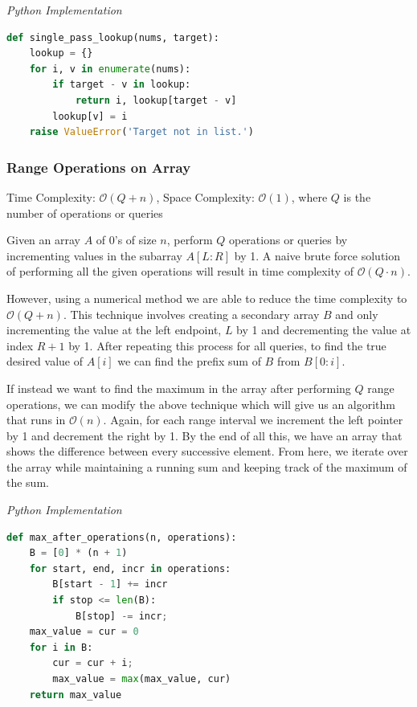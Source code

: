 \documentclass{article}
\newcommand{\bigO}{\mathcal{O}}
\begin{document}
\vspace{8pt} \emph{Python Implementation}
\begin{lstlisting}[language=Python]
def single_pass_lookup(nums, target):
    lookup = {}
    for i, v in enumerate(nums):
        if target - v in lookup:
            return i, lookup[target - v]
        lookup[v] = i
    raise ValueError('Target not in list.')
\end{lstlisting}
    
    \subsubsection{Range Operations on Array}
    Time Complexity: $\bigO(Q + n)$, Space Complexity: $\bigO(1)$, where $Q$ is the number of operations or queries
    
    Given an array $A$ of 0's of size $n$, perform $Q$ operations or queries by incrementing values in the subarray $A[L: R]$ by 1. A naive brute force solution of performing all the given operations will result in time complexity of $\bigO(Q\cdot n)$. 
    
    However, using a numerical method we are able to reduce the time complexity to $\bigO(Q + n)$. This technique involves creating a secondary array $B$ and only incrementing the value at the left endpoint, $L$ by 1 and decrementing the value at index $R + 1$ by 1. After repeating this process for all queries, to find the true desired value of $A[i]$ we can find the prefix sum of $B$ from $B[0:i]$.
    
    If instead we want to find the maximum in the array after performing $Q$ range operations, we can modify the above technique which will give us an algorithm that runs in $\bigO(n)$. Again, for each range interval we increment the left pointer by 1 and decrement the right by 1. By the end of all this, we have an array that shows the difference between every successive element. From here, we iterate over the array while maintaining a running sum and keeping track of the maximum of the sum.
    
\vspace{8pt} \emph{Python Implementation}
\begin{lstlisting}[language=Python]
def max_after_operations(n, operations):
    B = [0] * (n + 1)
    for start, end, incr in operations:
        B[start - 1] += incr
        if stop <= len(B):
            B[stop] -= incr;
    max_value = cur = 0
    for i in B:
        cur = cur + i;
        max_value = max(max_value, cur)
    return max_value
\end{lstlisting}
    
\end{document}
